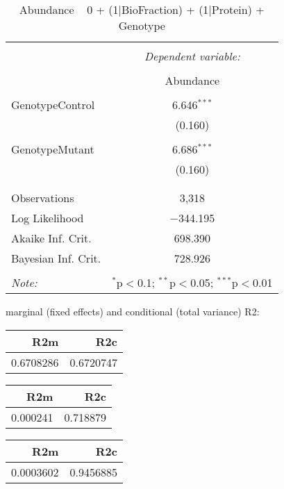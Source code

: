 \documentclass[11pt]{report}
\begin{document}
\begin{table}[!htbp] \centering 
  \caption{Abundance ~ 0 + (1|BioFraction) + (1|Protein) + Genotype} 
  \label{} 
\begin{tabular}{@{\extracolsep{5pt}}lc} 
\\[-1.8ex]\hline 
\hline \\[-1.8ex] 
 & \multicolumn{1}{c}{\textit{Dependent variable:}} \\ 
\cline{2-2} 
\\[-1.8ex] & Abundance \\ 
\hline \\[-1.8ex] 
 GenotypeControl & 6.646$^{***}$ \\ 
  & (0.160) \\ 
  & \\ 
 GenotypeMutant & 6.686$^{***}$ \\ 
  & (0.160) \\ 
  & \\ 
\hline \\[-1.8ex] 
Observations & 3,318 \\ 
Log Likelihood & $-$344.195 \\ 
Akaike Inf. Crit. & 698.390 \\ 
Bayesian Inf. Crit. & 728.926 \\ 
\hline 
\hline \\[-1.8ex] 
\textit{Note:}  & \multicolumn{1}{r}{$^{*}$p$<$0.1; $^{**}$p$<$0.05; $^{***}$p$<$0.01} \\ 
\end{tabular} 
\end{table} 
marginal (fixed effects) and conditional (total variance) R2:

\begin{tabular}{r|r}
\hline
R2m & R2c\\
\hline
0.6708286 & 0.6720747\\
\hline
\end{tabular}

\begin{tabular}{r|r}
\hline
R2m & R2c\\
\hline
0.000241 & 0.718879\\
\hline
\end{tabular}

\begin{tabular}{r|r}
\hline
R2m & R2c\\
\hline
0.0003602 & 0.9456885\\
\hline
\end{tabular}
\end{document}
